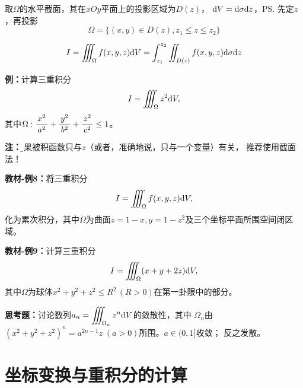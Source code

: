 取$\Omega$的水平截面，其在$xOy$平面上的投影区域为$D(z)$，
$\mathrm{d} V=\mathrm{d}\sigma \mathrm{d} z$，\ps{先定$z$，再投影}
$$\Omega=\{(x,y)\in D(z),z_1\leq z\leq z_2\}$$

\begin{center}
\end{center}

$${I=\iiint_{\Omega}f(x,y,z)\mathrm{d}
V=\int_{z_1}^{z_2}\iint_{D(z)}f(x,y,z)\mathrm{d}\sigma \mathrm{d} z}$$

{\bf 例：}计算三重积分
$$I=\iiint_{\Omega}z^2\mathrm{d} V,$$
其中$\Omega:\displaystyle\frac{\,{x^2}\,}{\,{a^2}\,}+\displaystyle\frac{\,{y^2}\,}{\,{b^2}\,}+\displaystyle\frac{\,{z^2}\,}{\,{c^2}\,}\leq 1$。

{\bf 注：}{\b 如果被积函数只与$z$（或者，准确地说，只与一个变量）有关，
推荐使用截面法！}

{\bf 教材-例8：}将三重积分
$$I=\iiint_{\Omega}f(x,y,z)\mathrm{d} V,$$
化为累次积分，其中$\Omega$为曲面$z=1-x,y=1-z^2$及三个坐标平面所围空间闭区域。

{\bf 教材-例9：}计算三重积分
$$I=\iiint_{\Omega}(x+y+2z)\mathrm{d} V,$$
其中$\Omega$为球体$x^2+y^2+z^2\leq R^2\,(R>0)$在第一卦限中的部分。

{\bf 思考题：}讨论数列$a_n=\displaystyle\iiint_{\Omega_n}z^n\mathrm{d} V$的敛散性，其中
$\Omega_n$由$(x^2+y^2+z^2)^n=a^{2n-1}z\;(a>0)$所围。\hfill $a\in(0,1]$收敛；
反之发散。

\section{坐标变换与重积分的计算}

